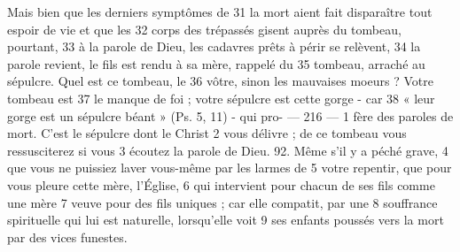 Mais bien que les derniers symptômes de	 
31	 	la mort aient fait disparaître tout espoir de vie et que les	 
32	 	corps des trépassés gisent auprès du tombeau, pourtant,	 
33	 	à la parole de Dieu, les cadavres prêts à périr se relèvent,	 
34	 	la parole revient, le fils est rendu à sa mère, rappelé du	 
35	 	tombeau, arraché au sépulcre. Quel est ce tombeau, le	 
36	 	vôtre, sinon les mauvaises moeurs ? Votre tombeau est	 
37	 	le manque de foi ; votre sépulcre est cette gorge - car	 
38	 	« leur gorge est un sépulcre béant » (Ps. 5, 11) - qui pro-	 
 	--- 216 ---	 
1	 	fère des paroles de mort. C'est le sépulcre dont le Christ	 
2	 	vous délivre ; de ce tombeau vous ressusciterez si vous	 
3	 	écoutez la parole de Dieu. 92. Même s'il y a péché grave,	 
4	 	que vous ne puissiez laver vous-même par les larmes de	 
5	 	votre repentir, que pour vous pleure cette mère, l'Église,	 
6	 	qui intervient pour chacun de ses fils comme une mère	 
7	 	veuve pour des fils uniques ; car elle compatit, par une	 
8	 	souffrance spirituelle qui lui est naturelle, lorsqu'elle voit	 
9	 	ses enfants poussés vers la mort par des vices funestes.